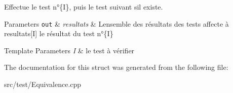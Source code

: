 Effectue le test n°\{I\}, puis le test suivant s\textquotesingle{}il existe.


\begin{DoxyParams}[1]{Parameters}
\mbox{\tt out}  & {\em resultats} & L\textquotesingle{}ensemble des résultats des tests affecte à resultats\mbox{[}I\mbox{]} le résultat du test n°\{I\}\\
\hline
\end{DoxyParams}

\begin{DoxyTemplParams}{Template Parameters}
{\em I} & le test à vérifier \\
\hline
\end{DoxyTemplParams}


The documentation for this struct was generated from the following file\+:\begin{DoxyCompactItemize}
\item 
src/test/Equivalence.\+cpp\end{DoxyCompactItemize}
